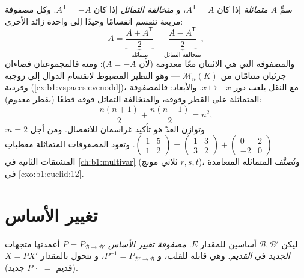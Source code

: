 \begin{example}
\label{ex:b1:matrices:symsplit}
سمِّ $A$ \emph{متماثلة} إذا كان $A^{\mathsf T} = A$، و
\emph{متخالفة التماثل} إذا كان $A^{\mathsf T} = -A$. وكل مصفوفة
مربعة تنقسم انقسامًا وحيدًا إلى واحدة زائد الأخرى:
\[
A = \underbrace{\frac{A + A^{\mathsf T}}{2}}_{\text{متماثلة}}
+ \underbrace{\frac{A - A^{\mathsf T}}{2}}_{\text{متخالفة التماثل}},
\]
والمصفوفة التي هي الاثنتان معًا معدومة (لأن $A = -A$): ومنه فالمجموعتان
فضاءان جزئيان متتامّان من $\mathcal{M}_n(K)$ --- وهو النظير
المضبوط لانقسام الدوال إلى زوجية وفردية
(\cref{ex:b1:vspaces:evenodd})، مع النقل يلعب
دور $x \mapsto -x$. والأبعاد: فالمصفوفة المتماثلة 
على القطر وفوقه، والمتخالفة التماثل فوقه قطعًا
(بقطر معدوم):
\[
\frac{n(n+1)}{2} + \frac{n(n-1)}{2} = n^2 ,
\]
وتوازن العدّ هو تأكيد غراسمان
للانفصال. ومن أجل $n = 2$: $\begin{pmatrix} 1 & 5\\ 1 &
2\end{pmatrix} = \begin{pmatrix} 1 & 3\\ 3 & 2\end{pmatrix} +
\begin{pmatrix} 0 & 2\\ -2 & 0\end{pmatrix}$. وتعود المصفوفات
المتماثلة معطياتِ المشتقات الثانية في
\cref{ch:b1:multivar} (ثلاثي مونج $r, s, t$)، وتُصنَّف
المتماثلة المتعامدة في
\cref{exo:b1:euclid:12}.
\end{example}

\section{تغيير الأساس}

\begin{definition}\label{def:b1:matrices:changeofbasis}
ليكن $\mathcal{B}, \mathcal{B}'$ أساسين للمقدار $E$. \emph{مصفوفة تغيير
الأساس} $P =
P_{\mathcal{B}\to\mathcal{B}'}$ أعمدتها 
متجهات  \emph{الجديد} في  \emph{القديم}. وهي
قابلة للقلب، و $P^{-1} = P_{\mathcal{B}'\to\mathcal{B}}$، و
تتحول  بالمقدار $X = PX'$ (قديم $=$ $P\,\cdot$ جديد).
\end{definition}

